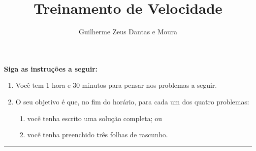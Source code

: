 \documentclass[10pt,a4paper]{scrartcl}
\title{Treinamento de Velocidade}
\author{Guilherme Zeus Dantas e Moura}
\begin{document}
	
	\zeustitle

	\begin{center}
		\textbf{\Large Siga as instruções a seguir:}
	\end{center}

	\begin{enumerate}[label = \textbullet]
		\item Você tem 1 hora e 30 minutos para pensar nos problemas a seguir.
		\item O seu objetivo é que, no fim do horário, para cada um dos quatro problemas:
			\begin{enumerate}[label = ---]
				\item você tenha escrito uma solução completa; ou
				\item você tenha preenchido três folhas de rascunho.
			\end{enumerate}
	\end{enumerate}

	\hrule\vspace{1em}

\end{document}
